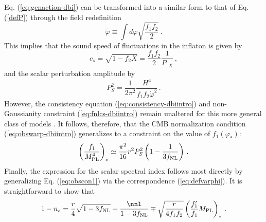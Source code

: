 Eq. (\ref{eq:genaction-dbi}) 
can be transformed into a similar form to that of 
Eq. (\ref{defP}) through the field redefinition 
% 
\begin{equation}
\label{eq:defvarphi}
\tilde{\varphi} \equiv \int d \varphi \sqrt{\frac{f_1f_2}{2}}  \,.
\end{equation}
% 
This implies that the sound speed of fluctuations in 
the inflaton is given by
%  
\begin{equation}
\label{eq:cs-dbi}
c_s = \sqrt{1-f_2 X} = \frac{f_1f_2}{2} \frac{1}{P_{,X}}  \,,
\end{equation}
% 
and the scalar perturbation amplitude by
% 
\begin{equation}
\label{eq:spectrum-dbi}
P_S^2 = \frac{1}{2\pi^2}\frac{H^4}{f_1f_2\dot{\varphi}^2}  \,.
\end{equation}
% 
However, the consistency equation (\ref{eq:consistency-dbiintro}) and 
non-Gaussianity constraint (\ref{eq:fnlcs-dbiintro}) remain unaltered 
for this more general class 
of models \cite{lidser2}. It 
follows, therefore, 
that the CMB normalization condition (\ref{eq:obswarp-dbiintro}) 
generalizes to a constraint on the value of $f_1 (\varphi_*)$:
%   
\begin{equation}
\label{eq:observef1}
\left( \frac{f_1}{M_{\mathrm{PL}}^4} \right)_{*} \simeq \frac{\pi^2}{16} r^2P_S^2
\left( 1- \frac{1}{3f_{\mathrm{NL}}} \right)  \,.
\end{equation}
% 
Finally, the expression for the scalar spectral index
follows most directly by generalizing Eq. (\ref{eq:obscon1}) 
via the correspondence (\ref{eq:defvarphi}). It  
is straightforward to show that
%  
\begin{equation}
\label{eq:nsconstraintW}
1-n_s = \frac{r}{4} \sqrt{1-3\fnl}
 +\frac{\nnl}{1-3\fnl} \mp \sqrt{\frac{r}{4f_1f_2}} \left( 
\frac{f_1'}{f_1} \Mpl \right)_*  \,.
\end{equation}
% 


